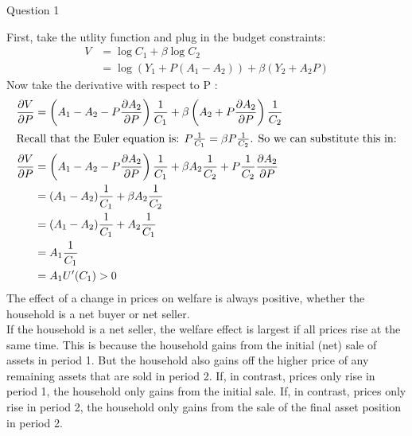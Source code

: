 \documentclass[a4paper]{article}
\newif\IfInSansMode
\begin{document}
\begin{questionbox}{Question 1}
\begin{enumerate}[(a)]
			\begin{explanationbox}
				First, take the utlity function and plug in the budget constraints:
				\begin{align*}
					V &= \log C_1 + \beta\log C_2\\
					&= \log (Y_1 + P(A_1 - A_2)) + \beta(Y_2 + A_2 P)
				\end{align*}
				Now take the derivative with respect to P :
				\begin{align*}
					\frac{\partial V}{\partial P} &= \left( A_1-A_2-P\frac{\partial A_2}{\partial P} \right) \frac{1}{C_1} + \beta\left( A_2 + P \frac{\partial A_2}{\partial P} \right) \frac{1}{C_2}\\
				\intertext{Recall that the Euler equation is: \( P\frac{1}{C_1} = \beta P \frac{1}{C_2} \). So we can substitute this in:}
					\frac{\partial V}{\partial P} &=\left( A_1-A_2-P\frac{\partial A_2}{\partial P} \right) \frac{1}{C_1} + \beta A_2 \frac{1}{C_2} + P \frac{1}{C_2}\frac{\partial A_2}{\partial P}\\
					&= (A_1 - A_2)\frac{1}{C_1} + \beta A_2 \frac{1}{C_2}\\
					&= (A_1 - A_2)\frac{1}{C_1} + A_2 \frac{1}{C_1}\\
					&= A_1 \frac{1}{C_1}\\
					&= A_1 U'(C_1) > 0
				\end{align*}
				The effect of a change in prices on welfare is always positive, whether the household is a net buyer or net seller.\\
				If the household is a net seller, the welfare eﬀect is largest if all prices rise at the same time. This is because the household gains from the initial (net) sale of assets in period 1. But the household also gains oﬀ the higher price of any remaining assets that are sold in period 2. If, in contrast, prices only rise in period 1, the household only gains from the initial sale. If, in contrast, prices only rise in period 2, the household only gains from the sale of the ﬁnal asset position in period 2.
			\end{explanationbox}
		\end{enumerate}
	\end{questionbox}
\end{document}
